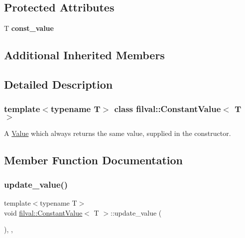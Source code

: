 \subsection*{Protected Attributes}
\begin{DoxyCompactItemize}
\item 
\hypertarget{classfilval_1_1ConstantValue_ae74437cc11c2f8e41bf21f0970600113}{}\label{classfilval_1_1ConstantValue_ae74437cc11c2f8e41bf21f0970600113} 
T {\bfseries const\+\_\+value}
\end{DoxyCompactItemize}
\subsection*{Additional Inherited Members}


\subsection{Detailed Description}
\subsubsection*{template$<$typename T$>$\newline
class filval\+::\+Constant\+Value$<$ T $>$}

A \hyperlink{classfilval_1_1Value}{Value} which always returns the same value, supplied in the constructor. 

\subsection{Member Function Documentation}
\hypertarget{classfilval_1_1ConstantValue_a2814dd032b5688fc91e844f1592d1b09}{}\label{classfilval_1_1ConstantValue_a2814dd032b5688fc91e844f1592d1b09} 
\subsubsection{\texorpdfstring{update\+\_\+value()}{update\_value()}}
{\footnotesize\ttfamily template$<$typename T$>$ \\
void \hyperlink{classfilval_1_1ConstantValue}{filval\+::\+Constant\+Value}$<$ T $>$\+::update\+\_\+value (\begin{DoxyParamCaption}{ }\end{DoxyParamCaption})\hspace{0.3cm}{\ttfamily [inline]}, {\ttfamily [protected]}, {\ttfamily [virtual]}}




